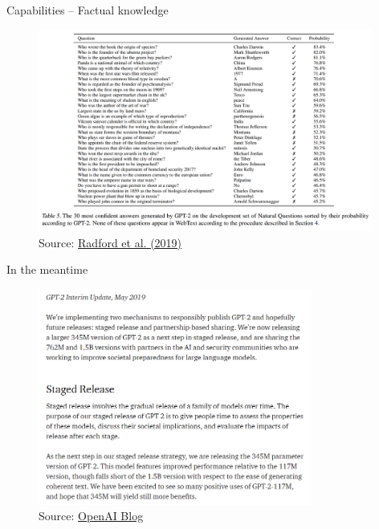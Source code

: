 
\begin{frame}{Capabilities -- Factual knowledge}

\vfill

\begin{figure}
\centering
\includegraphics[width = 11cm]{figure/gpt2-qa.png}\\ 
\footnotesize{Source:} \href{https://cdn.openai.com/better-language-models/language_models_are_unsupervised_multitask_learners.pdf}{\footnotesize Radford et al. (2019)}
\end{figure}

\vfill

\end{frame}


\begin{frame}{In the meantime}

\vfill

\begin{figure}
\centering
\includegraphics[width = 9cm]{figure/gpt2-release2.png}\\ 
\footnotesize{Source:} \href{https://openai.com/blog/better-language-models/\#sample1}{\footnotesize OpenAI Blog}
\end{figure}

\vfill

\end{frame}

